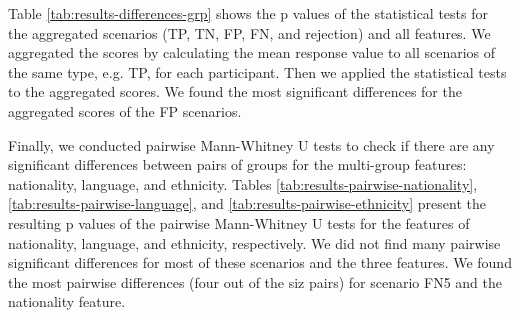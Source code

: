 %
Table \ref{tab:results-differences-grp} shows the p values of the statistical tests for the aggregated scenarios (TP, TN, FP, FN, and rejection) and all features.
%
We aggregated the scores by calculating the mean response value to all scenarios of the same type, e.g. TP, for each participant.
%
Then we applied the statistical tests to the aggregated scores.
%
We found the most significant differences for the aggregated scores of the FP scenarios.
%

%
Finally, we conducted pairwise Mann-Whitney U tests to check if there are any significant differences between pairs of groups for the multi-group features: nationality, language, and ethnicity.
%
Tables \ref{tab:results-pairwise-nationality}, \ref{tab:results-pairwise-language}, and \ref{tab:results-pairwise-ethnicity} present the resulting p values of the pairwise Mann-Whitney U tests for the features of nationality, language, and ethnicity, respectively.
%
We did not find many pairwise significant differences for most of these scenarios and the three features.
%
We found the most pairwise differences (four out of the siz pairs) for scenario FN5 and the nationality feature.
%
